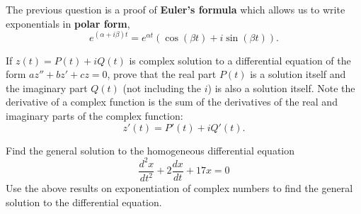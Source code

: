 \clearpage


The previous question is a proof of \textbf{Euler's formula} which allows us to write exponentials in \textbf{polar form},
\[ e^{(\alpha + i \beta) t} = e^{\alpha t} \left( \cos{(\beta t)} + i  \sin{(\beta t)} \right) .\]

\bs

\ii If $z(t)=P(t)+i Q(t)$ is complex solution to a differential equation of the form $az''+bz'+cz=0$,
prove that the real part $P(t)$ is a solution itself and the imaginary part $Q(t)$ (not including the $i$) is also a solution itself.
Note the derivative of a complex function is the sum of the derivatives of the real and imaginary parts of the complex function:
\[ z'(t) = P'(t) + i Q'(t) .\] \vfill

\clearpage



 

\item Find the general solution to the homogeneous differential equation \label{13problem14} 
\[
\frac{d^2x}{dt^2}+2 \frac{dx}{dt} + 17x=0
\]
Use the above results on exponentiation of complex numbers to find the general solution to the differential equation. \vfill



